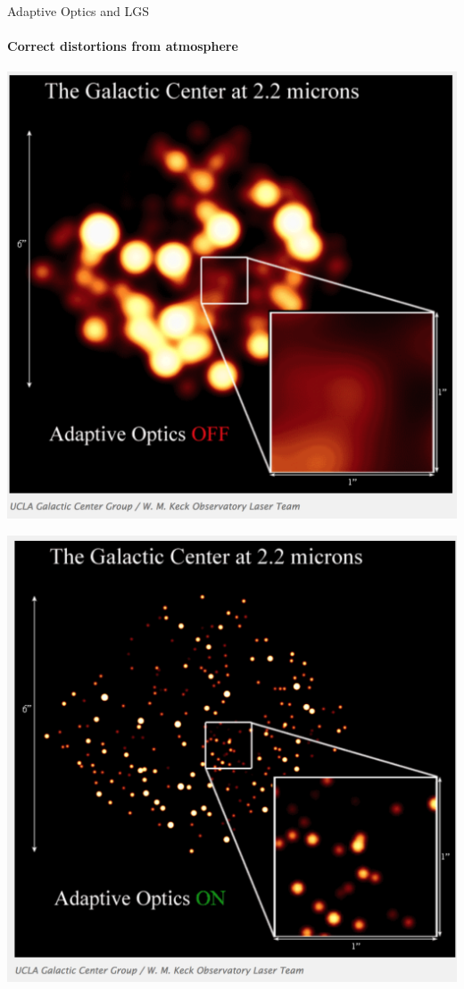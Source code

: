 \documentclass{beamer}
\begin{document}
\begin{frame}{Adaptive Optics and LGS}
  \framesubtitle{Correct distortions from atmosphere}
  \center
 \begin{minipage}{0.45\textwidth}
		  \centering
			\includegraphics[width=1.0\textwidth]{Images/galaxywoao.png}
	\end{minipage}
	\begin{minipage}{0.45\textwidth}
			\centering
			\includegraphics[width=1.0\textwidth]{Images/galaxywao.png}
	\end{minipage}	
\end{frame}
\end{document}
